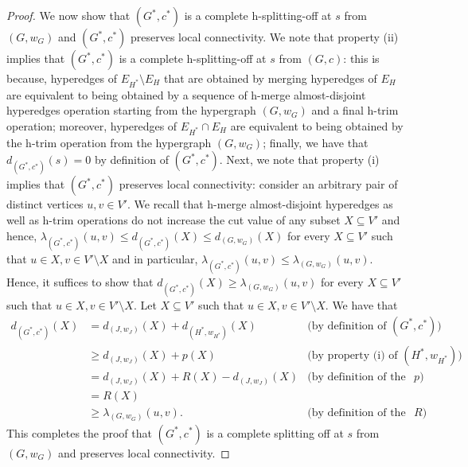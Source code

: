 \begin{proof}
    We now show that $(G^*, c^*)$ is a complete h-splitting-off at $s$ from $(G, w_G)$ and $(G^*, c^*)$ preserves local connectivity. 
    We note that property (ii) implies that $(G^*, c^*)$ is a complete h-splitting-off at $s$ from $(G, c)$: this is because, 
    hyperedges of $E_{H^*}\setminus E_H$ that are obtained by merging hyperedges of $E_H$ are equivalent to being obtained by a sequence of h-merge almost-disjoint hyperedges operation starting from the hypergraph $(G, w_G)$ and a final h-trim operation; 
    moreover, hyperedges of $E_{H^*}\cap E_H$ are equivalent to being obtained by the h-trim operation from the hypergraph $(G, w_G)$;  
    finally, we have that $d_{(G^*, c^*)}(s)=0$ by definition of $(G^*, c^*)$. 
    Next, we note that property (i) implies that $(G^*, c^*)$ preserves local connectivity: consider an arbitrary pair of distinct vertices $u, v\in V'$. We recall that h-merge almost-disjoint hyperedges as well as h-trim operations do not increase the cut value of any subset $X\subseteq V'$ and hence, $\lambda_{(G^*, c^*)}(u, v) \le d_{(G^*, c^*)}(X)\le d_{(G, w_G)}(X)$ for every $X\subseteq V'$ such that $u\in X, v\in V'\setminus X$ and in particular, $\lambda_{(G^*, c^*)}(u, v) \le \lambda_{(G, w_G)}(u, v)$. Hence, it suffices to show that $d_{(G^*, c^*)}(X)\ge \lambda_{(G, w_G)}(u, v)$ for every $X\subseteq V'$ such that $u\in X, v\in V'\setminus X$. Let $X\subseteq V'$ such that $u\in X, v\in V'\setminus X$. We have that 
    \begin{align*}
    d_{(G^*, c^*)}(X)
    &=d_{(J, w_J)}(X) + d_{(H^*, w_{H^*})}(X) & \text{(by definition of $(G^*, c^*)$)}\\
    &\ge d_{(J, w_J)}(X) +p(X) & \text{(by property (i) of $(H^*, w_{H^*})$)}\\
    &=d_{(J, w_J)}(X) +R(X)-d_{(J, w_J)}(X) & \text{(by definition of the function $p$)}\\
    &=R(X) \\
    &\ge \lambda_{(G, w_G)}(u,v). & \text{(by definition of the function $R$)}
    \end{align*}
    This completes the proof that $(G^*, c^*)$ is a complete splitting off at $s$ from $(G, w_G)$ and preserves local connectivity. 
    

\end{proof}
